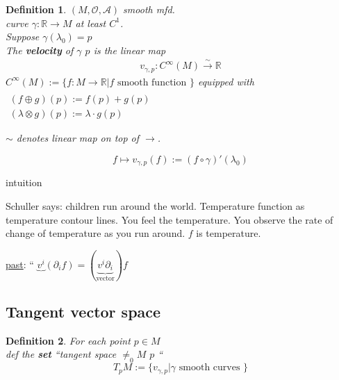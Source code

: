 \documentclass[10pt, twoside]{amsart}
\newtheorem{definition}{Definition}
\begin{document}
\begin{multicols*}{2}
\begin{definition}
  $(M,\mathcal{O},\mathcal{A})$ smooth mfd. \\
  curve $\gamma : \mathbb{R} \to M$ at least $C^1$.   \\
  Suppose $\gamma(\lambda_0) =p$ \\
  The \textbf{velocity} of $\gamma$ \@ $p$ is the linear map 
\[
\begin{gathered}
v_{\gamma, p} : C^{\infty}(M) \xrightarrow{ \sim } \mathbb{R}
\end{gathered}
\]
$C^{\infty}(M) := \lbrace f: M \to \mathbb{R} | f \text{ smooth function } \rbrace$ equipped with $\begin{gathered}  \quad \\ 
   (f\oplus g)(p) := f(p) + g(p) \\
   (\lambda \otimes g)(p) := \lambda \cdot g(p) \end{gathered}$

$\sim$ denotes linear map on top of $\xrightarrow{}$.

\[
f \mapsto v_{\gamma,p}(f):= (f\circ \gamma)'(\lambda_0)
\]


\end{definition}

intuition



Schuller says: children run around the world.  Temperature function as temperature contour lines.  You feel the temperature.  You observe the rate of change of temperature as you run around.  $f$ is temperature.  

\underline{past}: `` $\underbrace{v^i}_{} (\partial_i f) = (\underbrace{v^i \partial_i}_{\text{vector}})f$ 

\subsection{Tangent vector space}

\begin{definition}
  For each point $p \in M$ \\
def the \textbf{set} ``tangent space $\neq_0 M$ \@ $p$ ``
\[
T_p M := \lbrace v_{\gamma, p} | \gamma \text{ smooth curves } \rbrace
\]
\end{definition}


\end{multicols*}
\end{document}
